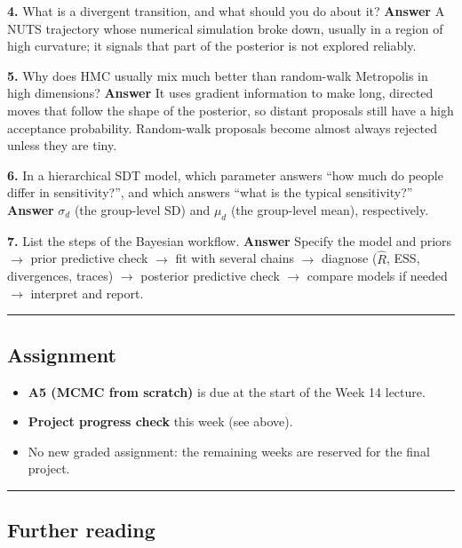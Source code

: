 \textbf{4.} What is a divergent transition, and what should you do about
it? \textbf{Answer} A NUTS trajectory whose numerical simulation broke
down, usually in a region of high curvature; it signals that part of the
posterior is not explored reliably.

\textbf{5.} Why does HMC usually mix much better than random-walk
Metropolis in high dimensions? \textbf{Answer} It uses gradient
information to make long, directed moves that follow the shape of the
posterior, so distant proposals still have a high acceptance
probability. Random-walk proposals become almost always rejected unless
they are tiny.

\textbf{6.} In a hierarchical SDT model, which parameter answers ``how
much do people differ in sensitivity?'', and which answers ``what is the
typical sensitivity?'' \textbf{Answer} \(\sigma_d\) (the group-level SD)
and \(\mu_d\) (the group-level mean), respectively.

\textbf{7.} List the steps of the Bayesian workflow. \textbf{Answer}
Specify the model and priors \ensuremath{\rightarrow} prior predictive check \ensuremath{\rightarrow} fit with several
chains \ensuremath{\rightarrow} diagnose (\(\hat R\), ESS, divergences, traces) \ensuremath{\rightarrow} posterior
predictive check \ensuremath{\rightarrow} compare models if needed \ensuremath{\rightarrow} interpret and report.

\begin{center}\rule{0.5\linewidth}{0.5pt}\end{center}

\subsection{Assignment}

\begin{itemize}
\tightlist
\item
  \textbf{A5 (MCMC from scratch)} is due at the start of the Week 14
  lecture.
\item
  \textbf{Project progress check} this week (see above).
\item
  No new graded assignment: the remaining weeks are reserved for the
  final project.
\end{itemize}

\begin{center}\rule{0.5\linewidth}{0.5pt}\end{center}

\subsection{Further reading}

